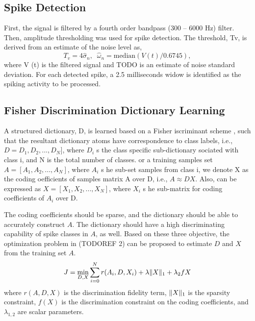 \documentclass[conference]{IEEEtran}
\begin{document}
	\subsection{Spike Detection}
	First, the signal is filtered by a fourth order bandpass (300 – 6000 Hz) filter. Then, amplitude thresholding was used for spike detection. The threshold, Tv, is derived from an estimate of the noise level \cite{quiroga2004unsupervised} as,
	\begin{equation}
		T_v=4\hat{\sigma}_n,\;\;\hat{\omega}_n=\mathrm{median}(V(t)/0.6745),
	\end{equation}
	where V (t) is the filtered signal and TODO is an estimate of noise standard deviation. For each detected spike, a 2.5 milliseconds widow is identified as the spiking activity to be processed.
	
	\subsection{Fisher Discrimination Dictionary Learning}
	A structured dictionary, D, is learned based on a Fisher iscriminant scheme \cite{yang2011fisher}, such that the resultant dictionary atoms have correspondence to class labels, i.e., $D = D_1, D_2, ..., D_N]$, where $D_i$ s the class specific sub-dictionary sociated with class i, and N is the total number of classes. or a training samples set $A = [A_1, A_2, ..., A_N]$, where $A_i$ s he sub-set samples from class i, we denote X as the coding oefficients of samples matrix A over D, i.e., $A \approx DX$. Also,  can be expressed as $X = [X_1, X_2, ..., X_N]$, where $X_i$ s he sub-matrix for coding coefficients of $A_i$ over D.
	
	The coding coefficients should be sparse, and the dictionary should be able to accurately construct $A$. The dictionary should have a high discriminating capability of spike classes in $A$, as well. Based on these three objective, the optimization problem in (TODOREF 2) can be proposed to estimate $D$ and $X$ from the training set $A$.
	\begin{equation}
		J=\min_{D,X}\sum_{i=0}^{N}r(A_i,D,X_i)+\lambda\Vert{X}\Vert_1+\lambda_2f{X}
	\end{equation}
	where $r(A, D, X)$ is the discrimination fidelity term, $\Vert{X}\Vert_1$ is the sparsity constraint, $f(X)$ is the discrimination constraint on the coding coefficients, and $\lambda_{1,2}$ are scalar parameters.
	
\end{document}
